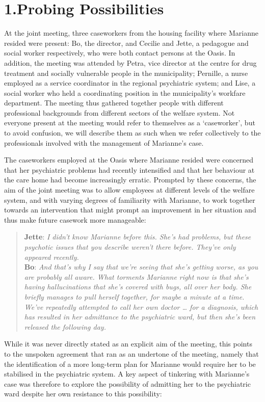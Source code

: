 \section{1.\hspace*{1em}Probing Possibilities}
At the joint meeting, three caseworkers from the housing facility where Marianne resided were present: Bo, the director, and Cecilie and Jette, a pedagogue and social worker respectively, who were both contact persons at the Oasis. In addition, the meeting was attended by Petra, vice director at the centre for drug treatment and socially vulnerable people in the municipality; Pernille, a nurse employed as a service coordinator in the regional psychiatric system; and Lise, a social worker who held a coordinating position in the municipality’s workfare department. The meeting thus gathered together people with different professional backgrounds from different sectors of the welfare system. Not everyone present at the meeting would refer to themselves as a ‘caseworker’, but to avoid confusion, we will describe them as such when we refer collectively to the professionals involved with the management of Marianne’s case.
\par
The caseworkers employed at the Oasis where Marianne resided were concerned that her psychiatric problems had recently intensified and that her behaviour at the care home had become increasingly erratic. Prompted by these concerns, the aim of the joint meeting was to allow employees at different levels of the welfare system, and with varying degrees of familiarity with Marianne, to work together towards an intervention that might prompt an improvement in her situation and thus make future casework more manageable:
    \blockquote{\normalfont\textbf{Jette}: \textit{I didn’t know Marianne before this. She’s had problems, but these psychotic issues that you describe weren’t there before. They’ve only appeared recently.}
    \\\textbf{Bo}: \textit{And that’s why I say that we’re seeing that she’s getting worse, as you are probably all aware. What torments Marianne right now is that she’s having hallucinations that she’s covered with bugs, all over her body. She briefly manages to pull herself together, for maybe a minute at a time. We’ve repeatedly attempted to call her own doctor … for a diagnosis, which has resulted in her admittance to the psychiatric ward, but then she’s been released the following day.}}
While it was never directly stated as an explicit aim of the meeting, this points to the unspoken agreement that ran as an undertone of the meeting, namely that the identification of a more long-term plan for Marianne would require her to be stabilised in the psychiatric system. A key aspect of tinkering with Marianne’s case was therefore to explore the possibility of admitting her to the psychiatric ward despite her own resistance to this possibility: 
